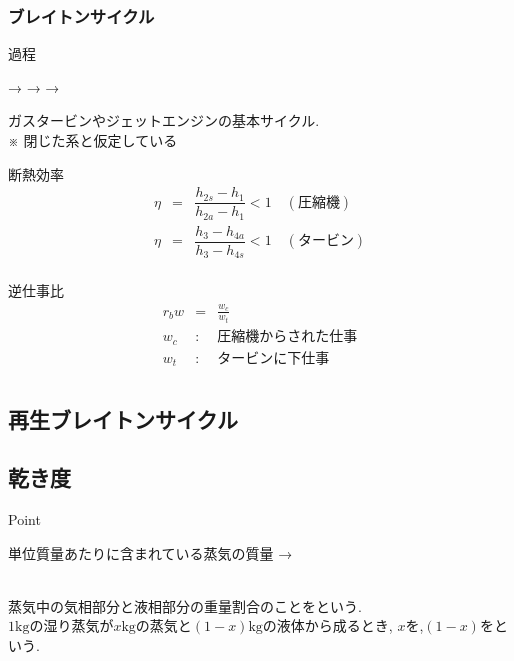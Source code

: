 \documentclass[a4paper]{jsarticle}
\begin{document}
\subsubsection{ブレイトンサイクル}
\begin{itembox}[l]{過程}
    \begin{center}
        \quad → \quad {} \quad → \quad {} \quad → \quad {}
    \end{center}
\end{itembox}
ガスタービンやジェットエンジンの基本サイクル.\\
※ 閉じた系と仮定している
\begin{itembox}[l]{断熱効率}
    \begin{eqnarray*}
        \eta &=& \dfrac{h_{2s}-h_1}{h_{2a}-h_1} <1 \quad (圧縮機)\\
        \eta &=& \dfrac{h_3-h_{4a}}{h_3-h_{4s}} <1 \quad (タービン)\\
    \end{eqnarray*}
\end{itembox}
\begin{itembox}[l]{逆仕事比}
    \begin{eqnarray*}
        r_bw &=& \frac{w_c}{w_t}\\
        w_c&:&圧縮機からされた仕事\\
        w_t&:&タービンに下仕事\\
    \end{eqnarray*}
\end{itembox}
\subsection{再生ブレイトンサイクル}
\subsection{乾き度}
\begin{itembox}[l]{Point}
    \begin{center}
        単位質量あたりに含まれている蒸気の質量 → 
    \end{center}
\end{itembox}
\\
蒸気中の気相部分と液相部分の重量割合のことをという.\\
$1\mathrm{kg}$の湿り蒸気が$x\mathrm{kg}$の蒸気と$\left(1-x\right)\mathrm{kg}$の液体から成るとき,
$x$を,$\left(1-x\right)$をという.
\end{document}
